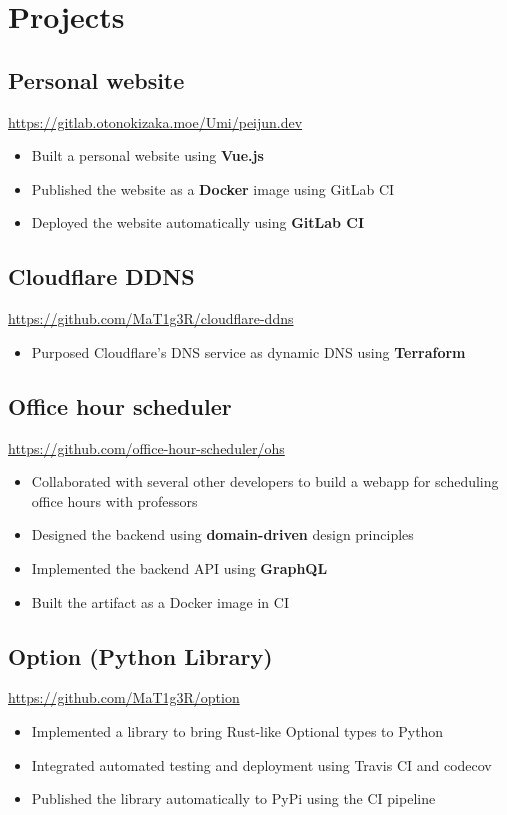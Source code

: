 \documentclass[letterpaper,12pt,oneside]{article}
\newcommand{\smallurl}[1]{\footnotesize{\url{#1}}\normalsize}
\begin{document}
\section*{Projects}

\subsection*{Personal website \hfill {}}
\smallurl{https://gitlab.otonokizaka.moe/Umi/peijun.dev}
\begin{itemize}
      \setlength\itemsep{0em}
      \item Built a personal website using \textbf{Vue.js}
      \item Published the website as a \textbf{Docker} image using GitLab CI
      \item Deployed the website automatically using \textbf{GitLab CI}
\end{itemize}

\subsection*{Cloudflare DDNS \hfill {}}
\smallurl{https://github.com/MaT1g3R/cloudflare-ddns}
\begin{itemize}
      \setlength\itemsep{0em}
      \item Purposed Cloudflare's DNS service as dynamic DNS using \textbf{Terraform}
\end{itemize}

\subsection*{Office hour scheduler \hfill {}}
\smallurl{https://github.com/office-hour-scheduler/ohs}
\begin{itemize}
      \setlength\itemsep{0em}
      \item Collaborated with several other developers to build a webapp for scheduling office hours with professors
      \item Designed the backend using \textbf{domain-driven} design principles
      \item Implemented the backend API using \textbf{GraphQL}
      \item Built the artifact as a Docker image in CI
\end{itemize}

\subsection*{Option (Python Library) \hfill {}}
\smallurl{https://github.com/MaT1g3R/option}
\begin{itemize}
      \setlength\itemsep{0em}
      \item Implemented a library to bring Rust-like Optional types to Python
      \item Integrated automated testing and deployment using Travis CI and codecov
      \item Published the library automatically to PyPi using the CI pipeline
\end{itemize}
\end{document}
